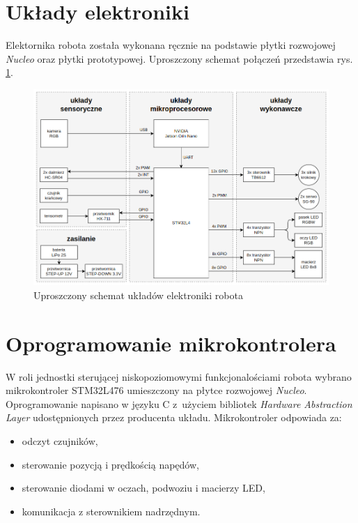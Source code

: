 \documentclass{article}
\begin{document}
    \section{Układy elektroniki}
        Elektornika robota została wykonana ręcznie na podstawie płytki rozwojowej \textit{Nucleo} oraz płytki prototypowej.
        Uproszczony schemat połączeń przedstawia rys. \ref{elektronika_schemat}.
        \begin{figure}[p]
            \centering
            \includegraphics[width=\textwidth]{figures/elektronika_schemat.png}
            \caption{Uproszczony schemat układów elektroniki robota}
            \label{elektronika_schemat}
        \end{figure}

    \pagebreak
    \section{Oprogramowanie mikrokontrolera}
        W roli jednostki sterującej niskopoziomowymi funkcjonalościami robota wybrano mikrokontroler STM32L476 umieszczony na płytce rozwojowej \textit{Nucleo}.
        Oprogramowanie napisano w języku C z~użyciem bibliotek \textit{Hardware Abstraction Layer} udostępnionych przez producenta układu.
        Mikrokontroler odpowiada za:
        \begin{itemize}
            \item odczyt czujników,
            \item sterowanie pozycją i prędkością napędów,
            \item sterowanie diodami w oczach, podwoziu i macierzy LED,
            \item komunikacja z sterownikiem nadrzędnym.
        \end{itemize}
\end{document}
